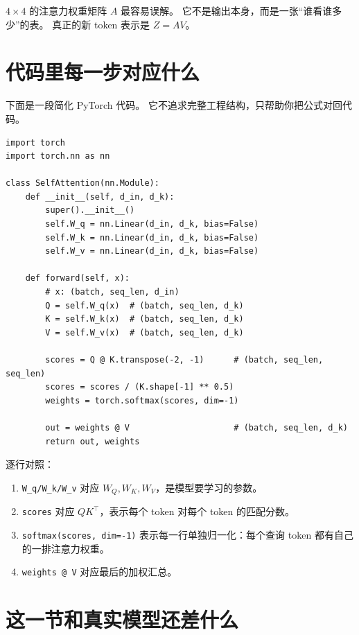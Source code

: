 \documentclass[11pt,a4paper]{ctexart}
\begin{document}
\begin{keypointblock}
\(4\times4\) 的注意力权重矩阵 \(A\) 最容易误解。
它不是输出本身，而是一张“谁看谁多少”的表。
真正的新 token 表示是 \(Z=AV\)。
\end{keypointblock}

\section{代码里每一步对应什么}

下面是一段简化 PyTorch 代码。
它不追求完整工程结构，只帮助你把公式对回代码。

\begin{codeblock}
\begin{lstlisting}
import torch
import torch.nn as nn

class SelfAttention(nn.Module):
    def __init__(self, d_in, d_k):
        super().__init__()
        self.W_q = nn.Linear(d_in, d_k, bias=False)
        self.W_k = nn.Linear(d_in, d_k, bias=False)
        self.W_v = nn.Linear(d_in, d_k, bias=False)

    def forward(self, x):
        # x: (batch, seq_len, d_in)
        Q = self.W_q(x)  # (batch, seq_len, d_k)
        K = self.W_k(x)  # (batch, seq_len, d_k)
        V = self.W_v(x)  # (batch, seq_len, d_k)

        scores = Q @ K.transpose(-2, -1)      # (batch, seq_len, seq_len)
        scores = scores / (K.shape[-1] ** 0.5)
        weights = torch.softmax(scores, dim=-1)

        out = weights @ V                     # (batch, seq_len, d_k)
        return out, weights
\end{lstlisting}
\end{codeblock}

逐行对照：

\begin{enumerate}
  \item \texttt{W\_q/W\_k/W\_v} 对应 \(W_Q,W_K,W_V\)，是模型要学习的参数。
  \item \texttt{scores} 对应 \(QK^\top\)，表示每个 token 对每个 token 的匹配分数。
  \item \texttt{softmax(scores, dim=-1)} 表示每一行单独归一化：每个查询 token 都有自己的一排注意力权重。
  \item \texttt{weights @ V} 对应最后的加权汇总。
\end{enumerate}

\section{这一节和真实模型还差什么}
\end{document}
